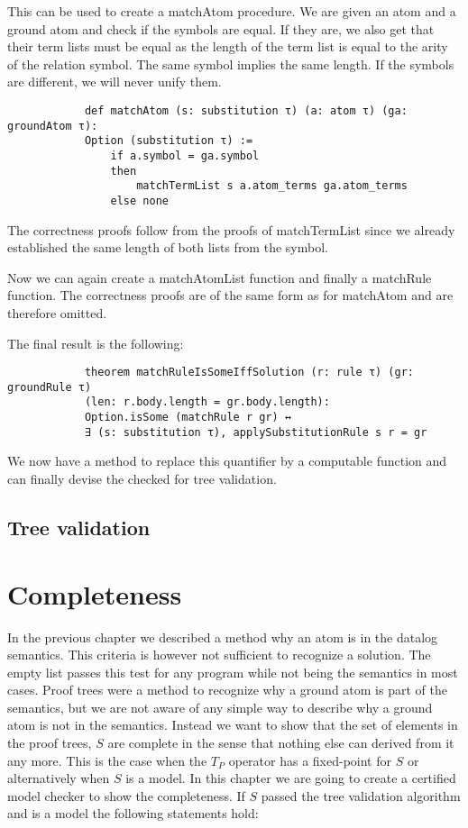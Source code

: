 \documentclass{article}
\begin{document}
        This can be used to create a matchAtom procedure. We are given an atom and a ground atom and check if the symbols are equal. If they are, we also get that their term lists must be equal as the length of the term list is equal to the arity of the relation symbol. The same symbol implies the same length.
        If the symbols are different, we will never unify them.

        \begin{lstlisting}
            def matchAtom (s: substitution τ) (a: atom τ) (ga: groundAtom τ):
            Option (substitution τ) :=
                if a.symbol = ga.symbol
                then
                    matchTermList s a.atom_terms ga.atom_terms
                else none
        \end{lstlisting}

        The correctness proofs follow from the proofs of matchTermList since we already established the same length of both lists from the symbol.

        Now we can again create a matchAtomList function and finally a matchRule function. The correctness proofs are of the same form as for matchAtom and are therefore omitted.

        The final result is the following:
        \begin{lstlisting}
            theorem matchRuleIsSomeIffSolution (r: rule τ) (gr: groundRule τ) 
            (len: r.body.length = gr.body.length): 
            Option.isSome (matchRule r gr) ↔ 
            ∃ (s: substitution τ), applySubstitutionRule s r = gr
        \end{lstlisting}

        We now have a method to replace this quantifier by a computable function and can finally devise the checked for tree validation.

        \subsection{Tree validation}

    \section{Completeness}

    In the previous chapter we described a method why an atom is in the datalog semantics. This criteria is however not sufficient to recognize a solution. The empty list passes this test for any program while not being the semantics in most cases. Proof trees were a method to recognize why a ground atom is part of the semantics, but we are not aware of any simple way to describe why a ground atom is not in the semantics. Instead we want to show that the set of elements in the proof trees, $S$ are complete in the sense that nothing else can derived from it any more. This is the case when the $T_P$ operator has a fixed-point for $S$ or alternatively when $S$ is a model. In this chapter we are going to create a certified model checker to show the completeness. If $S$ passed the tree validation algorithm and is a model the following statements hold:
\end{document}
